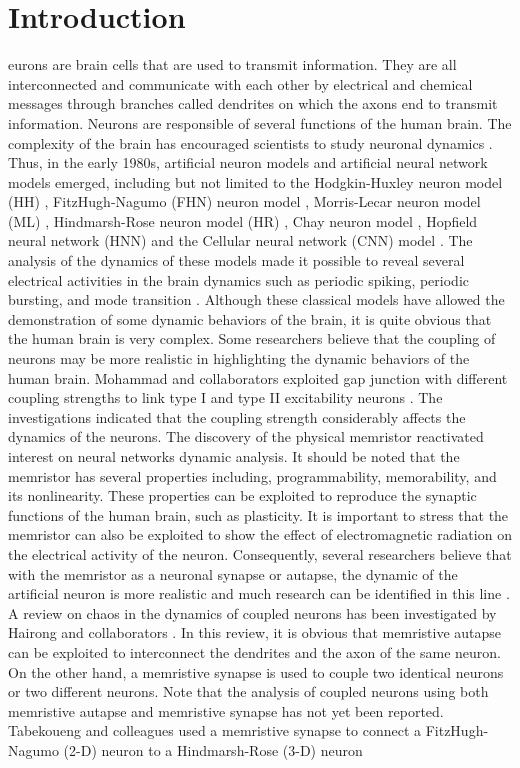 \documentclass[journal]{IEEEtran/IEEEtran}
\begin{document}
\section{Introduction}
\label{intro}
eurons are brain cells that are used to transmit information. They are all interconnected and communicate with each other by electrical and chemical messages through branches called dendrites on which the axons end to transmit information. Neurons are responsible of several functions of the human brain. The complexity of the brain has encouraged scientists to study neuronal dynamics \cite{sung2022simultaneous}. Thus, in the early 1980s, artificial neuron models and artificial neural network models emerged, including but not limited to the Hodgkin-Huxley neuron model (HH) \cite{abbott1990model}, FitzHugh-Nagumo (FHN) neuron model \cite{nouri2015digital}, Morris-Lecar neuron model (ML) \cite{song2019autapse}, Hindmarsh-Rose neuron model (HR) \cite{cai2021smooth}, Chay neuron model \cite{xu2020bifurcations}, Hopfield neural network (HNN) \cite{bao2019dynamical} and the Cellular neural network (CNN) model \cite{tlelo2022optimization}. The analysis of the dynamics of these models made it possible to reveal several electrical activities in the brain dynamics such as periodic spiking, periodic bursting, and mode transition \cite{njitacke2021window}. Although these classical models have allowed the demonstration of some dynamic behaviors of the brain, it is quite obvious that the human brain is very complex. Some researchers believe that the coupling of neurons may be more realistic in highlighting the dynamic behaviors of the human brain. Mohammad and collaborators exploited gap junction with different coupling strengths to link type I and type II excitability neurons \cite{razvan2020emergence}. The investigations indicated that the coupling strength considerably affects the dynamics of the neurons. The discovery of the physical memristor reactivated interest on neural networks dynamic analysis. It should be noted that the memristor has several properties including, programmability, memorability, and its nonlinearity. These properties can be exploited to reproduce the synaptic functions of the human brain, such as plasticity. It is important to stress that the memristor can also be exploited to show the effect of electromagnetic radiation on the electrical activity of the neuron. Consequently, several researchers believe that with the memristor as a neuronal synapse or autapse, the dynamic of the artificial neuron is more realistic and much research can be identified in this line \cite{lin2021review}. A review on chaos in the dynamics of coupled neurons has been investigated by Hairong and collaborators \cite{lin2021review}. In this review, it is obvious that memristive autapse can be exploited to interconnect the dendrites and the axon of the same neuron. On the other  hand, a  memristive synapse is used to couple two identical neurons or two different neurons. Note that the analysis of coupled neurons using both memristive autapse and memristive synapse has not yet been reported. Tabekoueng and colleagues used a memristive synapse to connect a FitzHugh-Nagumo (2-D) neuron to a  Hindmarsh-Rose (3-D) neuron 
\end{document}
